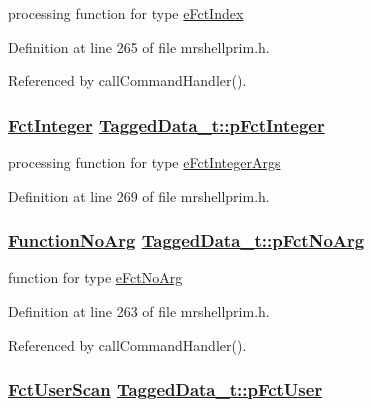 processing function for type \hyperlink{mrshellprim_8h_76a810650461f2062938ee9b82666b369d37de9621433ecd8d0b29cb7a8b1536}{e\-Fct\-Index} 



Definition at line 265 of file mrshellprim.h.

Referenced by call\-Command\-Handler().\hypertarget{structTaggedData__t_c607179a1f664681add71110b5f025fe}{
\subsubsection[pFctInteger]{\setlength{\rightskip}{0pt plus 5cm}\hyperlink{mrshellprim_8h_6dfb2d9a1efb85cb44f59123ebdb1cc4}{Fct\-Integer} \hyperlink{structTaggedData__t_c607179a1f664681add71110b5f025fe}{Tagged\-Data\_\-t::p\-Fct\-Integer}}}
\label{structTaggedData__t_c607179a1f664681add71110b5f025fe}


processing function for type \hyperlink{mrshellprim_8h_76a810650461f2062938ee9b82666b366feb19b8074a5ad5e422022891e6e2f5}{e\-Fct\-Integer\-Args} 



Definition at line 269 of file mrshellprim.h.\hypertarget{structTaggedData__t_8d22eeb05b434ae5553b78a0bf668b9d}{
\subsubsection[pFctNoArg]{\setlength{\rightskip}{0pt plus 5cm}\hyperlink{mrshellprim_8h_25a848858601a9d7593db26db1933c8f}{Function\-No\-Arg} \hyperlink{structTaggedData__t_8d22eeb05b434ae5553b78a0bf668b9d}{Tagged\-Data\_\-t::p\-Fct\-No\-Arg}}}
\label{structTaggedData__t_8d22eeb05b434ae5553b78a0bf668b9d}


function for type \hyperlink{mrshellprim_8h_76a810650461f2062938ee9b82666b3693da28770e1bd5abcff3bfab36328f85}{e\-Fct\-No\-Arg} 



Definition at line 263 of file mrshellprim.h.

Referenced by call\-Command\-Handler().\hypertarget{structTaggedData__t_bb58753067b96e761a11884323f1fca9}{
\subsubsection[pFctUser]{\setlength{\rightskip}{0pt plus 5cm}\hyperlink{mrshellprim_8h_8f5e79dc67d35c6c5990f753f9490708}{Fct\-User\-Scan} \hyperlink{structTaggedData__t_bb58753067b96e761a11884323f1fca9}{Tagged\-Data\_\-t::p\-Fct\-User}}}
\label{structTaggedData__t_bb58753067b96e761a11884323f1fca9}


